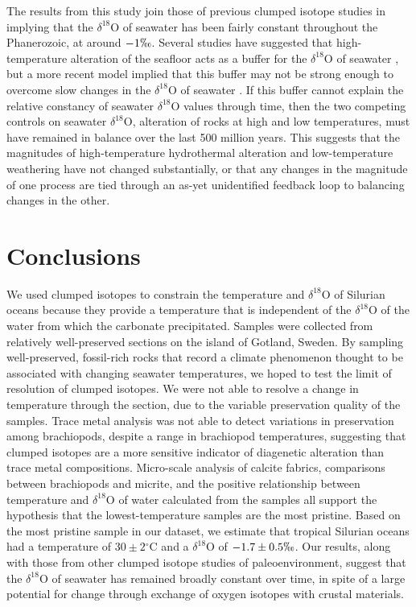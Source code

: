 \documentclass{article}
\newcommand{\deltao}{$\delta^{18}$}
\newcommand{\degrees}{$^{\circ}$}
\begin{document}
The results from this study join those of previous clumped isotope studies in implying that the \deltao O of seawater has been fairly constant throughout the Phanerozoic, at around $-1\permil$. Several studies have suggested that high-temperature alteration of the seafloor acts as a buffer for the \deltao O of seawater \citep{Muehlenbachs1976,Gregory1981,Gregory1991,Muehlenbachs1998}, but a more recent model implied that this buffer may not be strong enough to overcome slow changes in the \deltao O of seawater \citep{Jaffres2007}. If this buffer cannot explain the relative constancy of seawater \deltao O values through time, then the two competing controls on seawater \deltao O, alteration of rocks at high and low temperatures, must have remained in balance over the last 500 million years. This suggests that the magnitudes of high-temperature hydrothermal alteration and low-temperature weathering have not changed substantially, or that any changes in the magnitude of one process are tied through an as-yet unidentified feedback loop to balancing changes in the other. 

\section{Conclusions}

We used clumped isotopes to constrain the temperature and \deltao O of Silurian oceans because they provide a temperature that is independent of the \deltao O of the water from which the carbonate precipitated. Samples were collected from relatively well-preserved sections on the island of Gotland, Sweden. By sampling well-preserved, fossil-rich rocks that record a climate phenomenon thought to be associated with changing seawater temperatures, we hoped to test the limit of resolution of clumped isotopes. We were not able to resolve a change in temperature through the section, due to the variable preservation quality of the samples. Trace metal analysis was not able to detect variations in preservation among brachiopods, despite a range in brachiopod temperatures, suggesting that clumped isotopes are a more sensitive indicator of diagenetic alteration than trace metal compositions. Micro-scale analysis of calcite fabrics, comparisons between brachiopods and micrite, and the positive relationship between temperature and \deltao O of water calculated from the samples all support the hypothesis that the lowest-temperature samples are the most pristine. Based on the most pristine sample in our dataset, we estimate that tropical Silurian oceans had a temperature of  $30\pm 2$\degrees C and a \deltao O of $-1.7\pm 0.5\permil$. Our results, along with those from other clumped isotope studies of paleoenvironment, suggest that the \deltao O of seawater has remained broadly constant over time, in spite of a large potential for change through exchange of oxygen isotopes with crustal materials. 
\end{document}
